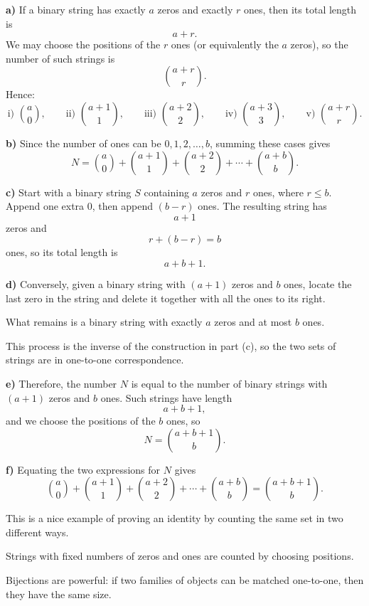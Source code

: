 \begin{solution}
\textbf{a)} If a binary string has exactly $a$ zeros and exactly $r$ ones, then its total length is
\[
a+r.
\]
We may choose the positions of the $r$ ones (or equivalently the $a$ zeros), so the number of such strings is
\[
\binom{a+r}{r}.
\]
Hence:
\[
\text{i) } \binom{a}{0},\qquad
\text{ii) } \binom{a+1}{1},\qquad
\text{iii) } \binom{a+2}{2},\qquad
\text{iv) } \binom{a+3}{3},\qquad
\text{v) } \binom{a+r}{r}.
\]

\textbf{b)} Since the number of ones can be $0,1,2,\dots,b$, summing these cases gives
\[
N=\binom{a}{0}+\binom{a+1}{1}+\binom{a+2}{2}+\cdots+\binom{a+b}{b}.
\]

\textbf{c)} Start with a binary string $S$ containing $a$ zeros and $r$ ones, where $r\le b$.
Append one extra $0$, then append $(b-r)$ ones. The resulting string has
\[
a+1
\]
zeros and
\[
r+(b-r)=b
\]
ones, so its total length is
\[
a+b+1.
\]

\textbf{d)} Conversely, given a binary string with $(a+1)$ zeros and $b$ ones, locate the last zero in the string and delete it together with all the ones to its right.

What remains is a binary string with exactly $a$ zeros and at most $b$ ones.

This process is the inverse of the construction in part (c), so the two sets of strings are in one-to-one correspondence.

\textbf{e)} Therefore, the number $N$ is equal to the number of binary strings with $(a+1)$ zeros and $b$ ones.
Such strings have length
\[
a+b+1,
\]
and we choose the positions of the $b$ ones, so
\[
N=\binom{a+b+1}{b}.
\]

\textbf{f)} Equating the two expressions for $N$ gives
\[
\boxed{
\binom{a}{0}+\binom{a+1}{1}+\binom{a+2}{2}+\cdots+\binom{a+b}{b}
=
\binom{a+b+1}{b}.
}
\]
\end{solution}

\begin{takeaways}
\item This is a nice example of proving an identity by counting the same set in two different ways.
\item Strings with fixed numbers of zeros and ones are counted by choosing positions.
\item Bijections are powerful: if two families of objects can be matched one-to-one, then they have the same size.
\end{takeaways}

